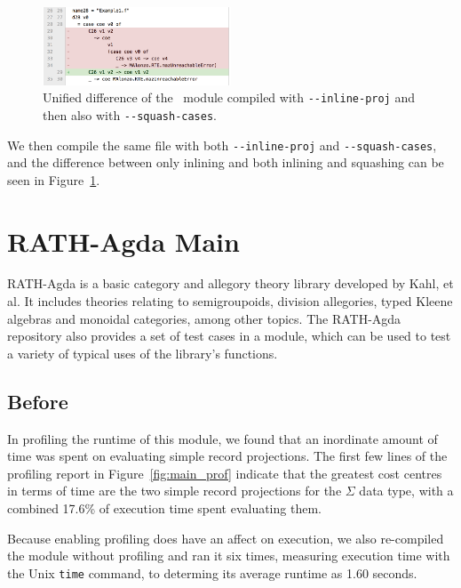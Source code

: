 \begin{figure}
    \centering
    \includegraphics[width=0.5\textwidth]{Figures/Example1_squash}
    \caption{Unified difference of the ~module compiled  with \texttt{-{}-inline-proj} and then also with \texttt{-{}-squash-cases}.}
    \label{fig:Example1_squash}
\end{figure}

We then compile the same file with both \texttt{-{}-inline-proj} and \texttt{-{}-squash-cases}, and the difference between only inlining and both inlining and squashing can be seen in Figure~\ref{fig:Example1_squash}.

\section{RATH-Agda Main}
\label{sec:app_one}

RATH-Agda is a basic category and allegory theory library developed by Kahl, et al.\cite{kahl2017} It includes theories relating to semigroupoids, division allegories, typed Kleene algebras and monoidal categories, among other topics.\cite{kahl2017} The RATH-Agda repository also provides a set of test cases in a  module, which can be used to test a variety of typical uses of the library's functions.

\subsection{Before}



In profiling the runtime of this  module, we found that an inordinate amount of time was spent on evaluating simple record projections. The first few lines of the profiling report in Figure~\ref{fig:main_prof} indicate that the greatest cost centres in terms of time are the two simple record projections for the $\Sigma$ data type, with a combined 17.6\% of execution time spent evaluating them.

Because enabling profiling does have an affect on execution, we also re-compiled the module without profiling and ran it six times, measuring execution time with the Unix \texttt{time} command, to determing its average runtime as 1.60 seconds.

